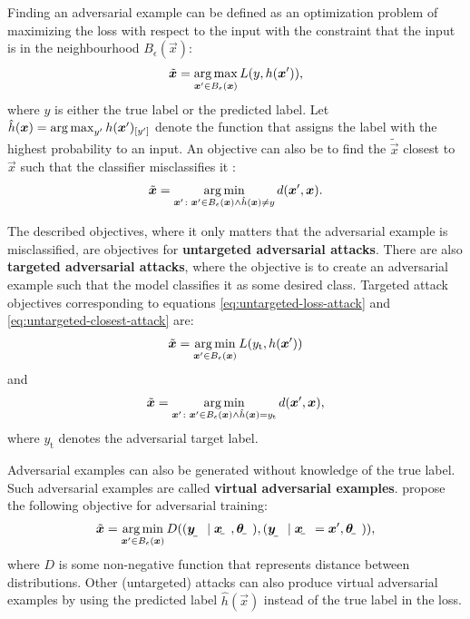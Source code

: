 \documentclass{article}
\begin{document}
Finding an adversarial example can be defined as an optimization problem of maximizing the loss with respect to the input with the constraint that the input is in the neighbourhood $B_\epsilon(\vec x)$:
\begin{align}
    \tilde{\vec x} = \argmax_{\vec x'\in B_\epsilon(\vec x)} L(y, h(\vec x')) , \label{eq:untargeted-loss-attack}
\end{align}
where $y$ is either the true label or the predicted label. Let $\hat{h}(\vec x) = \argmax_{y'} h(\vec x')_\ind{y'}$ denote the function that assigns the label with the highest probability to an input.
An objective can also be to find the $\tilde{\vec x}$ closest to $\vec x$ such that the classifier misclassifies it \citep{Moosavi-Dezfooli:2016:DFSAMFDNN}:
\begin{align}
    \tilde{\vec x} = \argmin_{\vec x'\colon \vec x'\in B_\epsilon(\vec x) \land \hat{h}(\vec x) \neq y} d(\vec x', \vec x). \label{eq:untargeted-closest-attack}
\end{align}

The described objectives, where it only matters that the adversarial example is misclassified, are objectives for \textbf{untargeted adversarial attacks}. There are also \textbf{targeted adversarial attacks}, where the objective is to create an adversarial example such that the model classifies it as some desired class. Targeted attack objectives corresponding to equations \eqref{eq:untargeted-loss-attack} and \eqref{eq:untargeted-closest-attack} are:
\begin{align}
    \tilde{\vec x} = \argmin_{\vec x'\in B_\epsilon(\vec x)} L(y_\text{t}, h(\vec x')) \label{eq:targeted-loss-attack}
\end{align}
and
\begin{align}
    \tilde{\vec x} = \argmin_{\vec x'\colon \vec x'\in B_\epsilon(\vec x) \land \hat{h}(\vec x) = y_\text{t}} d(\vec x', \vec x), \label{eq:targeted-closest-attack}
\end{align}
where $y_\text{t}$ denotes the adversarial target label.

Adversarial examples can also be generated without knowledge of the true label. Such adversarial examples are called \textbf{virtual adversarial examples}.
\cite{Miyato:2017:VATRMSSSL} propose the following objective for adversarial training:
\begin{align}
    \tilde{\vec x} = \argmin_{\vec x'\in B_\epsilon(\vec x)} D((\rvec y\mid \rvec x, \rvec\theta), (\rvec y\mid \rvec x = \vec x', \rvec\theta)),  
\end{align}
where $D$ is some non-negative function that represents distance between distributions. Other (untargeted) attacks can also produce virtual adversarial examples by using the predicted label $\hat{h}(\vec x)$ instead of the true label in the loss.
\end{document}
